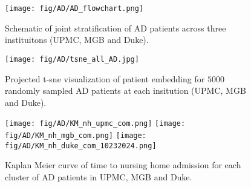 \documentclass{article}
\begin{document}
\begin{figure}[H]
    \centering
    \texttt{[image: fig/AD/AD\_flowchart.png]}
    \caption{Schematic of joint stratification of AD patients across three instituitons (UPMC, MGB and Duke).}
    \label{fig:AD_flow}
\end{figure}

\begin{figure}[H]
    \centering
    \texttt{[image: fig/AD/tsne\_all\_AD.jpg]}
    \caption{Projected t-sne visualization of patient embedding for $5000$ randomly sampled AD patients at each insitution (UPMC, MGB and Duke).}
    \label{fig:AD_tsne}
\end{figure}

\begin{figure}[H]
    \centering
    \texttt{[image: fig/AD/KM\_nh\_upmc\_com.png]}\hfill
    \texttt{[image: fig/AD/KM\_nh\_mgb\_com.png]}\hfill
    \texttt{[image: fig/AD/KM\_nh\_duke\_com\_10232024.png]}
    \caption{Kaplan Meier curve of time to nursing home admission for each cluster of AD patients in UPMC, MGB and Duke.}
    \label{fig:AD_KM}
\end{figure}
\end{document}
